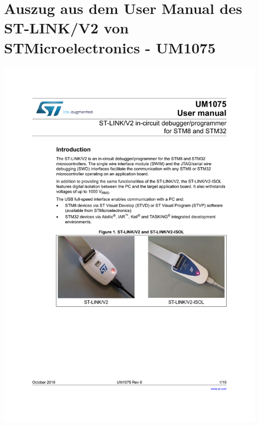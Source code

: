 \section{Auszug aus dem User Manual des ST-LINK/V2 von STMicroelectronics - UM1075}
\begin{center}\label{app:stlink}
	\includegraphics[page=12,width=0.96\columnwidth]{./datenblaetter/ST_LINK_V2}
\end{center}
